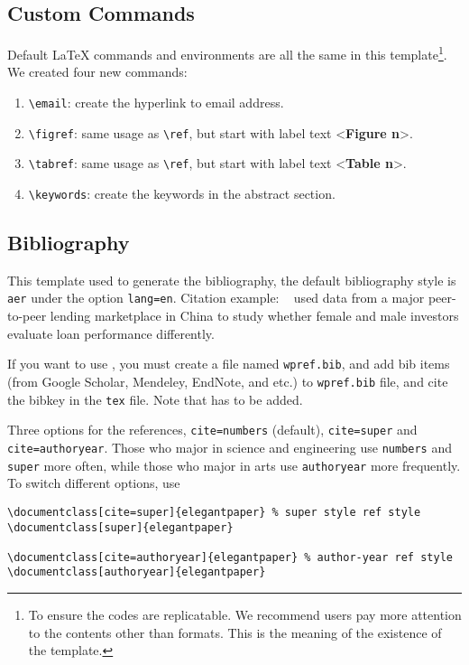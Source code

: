\documentclass[11pt,en,authoryear]{elegantpaper}
\begin{document}
\subsection{Custom Commands}
Default \LaTeX{} commands and environments are all the same in this template\footnote{To ensure the codes are replicatable. We recommend users pay more attention to the contents other than formats. This is the meaning of the existence of the template.}. We created four new commands:
\begin{enumerate}
	\item \lstinline{\email}: create the hyperlink to email address.
	\item \lstinline{\figref}: same usage as \lstinline{\ref}, but start with label text <\textbf{Figure n}>.
	\item \lstinline{\tabref}: same usage as \lstinline{\ref}, but start with label text <\textbf{Table n}>.
	\item \lstinline{\keywords}: create the keywords in the abstract section.
\end{enumerate}


\subsection{Bibliography}
This template used  to generate the bibliography, the default bibliography style is  \lstinline{aer} under the option \lstinline{lang=en}. Citation example: ~\cite{en3} used data from a major peer-to-peer lending marketplace in China to study whether female and male investors evaluate loan performance differently. 

If you want to use , you must create a file named \lstinline{wpref.bib}, and add bib items (from Google Scholar, Mendeley, EndNote, and etc.) to \lstinline{wpref.bib} file, and cite the bibkey in the \lstinline{tex} file. Note that  has to be added.

Three options for the references, \lstinline{cite=numbers} (default), \lstinline{cite=super} and \lstinline{cite=authoryear}. Those who major in science and engineering use \lstinline{numbers} and \lstinline{super} more often, while those who major in arts use \lstinline{authoryear} more frequently. To switch different options, use
\begin{lstlisting}
\documentclass[cite=super]{elegantpaper} % super style ref style
\documentclass[super]{elegantpaper}

\documentclass[cite=authoryear]{elegantpaper} % author-year ref style
\documentclass[authoryear]{elegantpaper}
\end{lstlisting}
\end{document}
